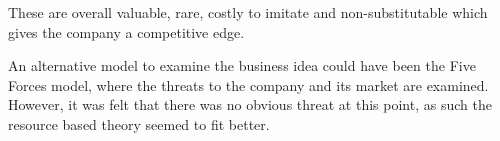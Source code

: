 These are overall valuable, rare, costly to imitate and non-substitutable which gives the company a competitive edge.

An alternative model to examine the business idea could have been the Five Forces model, where the threats to the company and its market are examined.
However, it was felt that there was no obvious threat at this point, as such the resource based theory seemed to fit better\citep[pg. 16]{book:jrose}.


